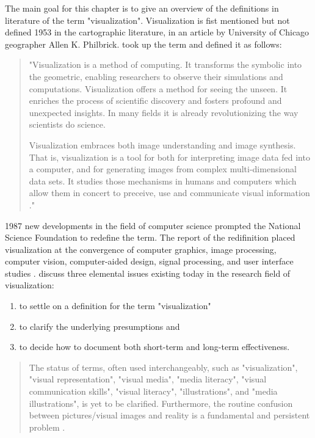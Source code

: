 The main goal for this chapter is to give an overview of the definitions in literature of the term "visualization". Visualization is fist mentioned but not defined 1953 in the cartographic literature, in an article by University of Chicago geographer Allen K. Philbrick. \citeauthor{mccormick:1987} took up the term and defined it as follows:
\begin{quote}
 "Visualization is a method of computing. It transforms the symbolic into the geometric, enabling researchers to observe their simulations and computations. Visualization offers a method for seeing the unseen. It enriches the process of scientific discovery and fosters profound and unexpected insights. In many fields it is already revolutionizing the way scientists do science.

 Visualization embraces both image understanding and image synthesis. That is, visualization is a tool for both for interpreting image data fed into a computer, and for generating images from complex multi-dimensional data sets. It studies those mechanisms in humans and computers which allow them in concert to preceive, use and communicate visual information ."
\end{quote}

1987 new developments in the field of computer science prompted the National Science Foundation to redefine the term. The report of the redifinition placed visualization at the convergence of computer graphics, image processing, computer vision, computer-aided design, signal processing, and user interface studies . \citeauthor{Phillips2010} discuss three elemental issues existing today in the research field of visualization:

\begin{enumerate}
\item to settle on a definition for the term "visualization"
\item to clarify the underlying presumptions and
\item to decide how to document both short-term and long-term effectiveness.
\end{enumerate}

\begin{quote}
The status of terms, often used interchangeably, such as "visualization", "visual representation", "visual media", "media literacy", "visual communication skills", "visual literacy", "illustrations", and "media illustrations", is yet to be clarified. Furthermore, the routine confusion between pictures/visual images and reality is a fundamental and persistent problem .
\end{quote}

